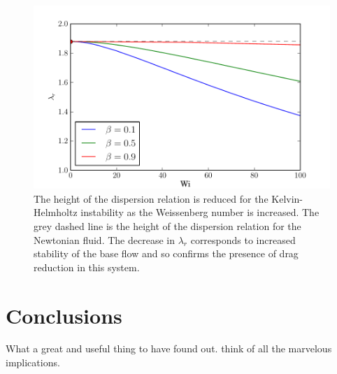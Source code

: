 \documentclass{jfm}
\begin{document}
\begin{figure}
    \centering
    \includegraphics[width=\textwidth]{KH_high_Re_vary_Wi}
    \caption{The height of the dispersion relation is reduced for the Kelvin-Helmholtz instability as the Weissenberg number is increased. The grey dashed line is the height of the dispersion relation for the Newtonian fluid. The decrease in $\lambda_{r}$ corresponds to increased stability of the base flow and so confirms the presence of drag reduction in this system.}
    \label{fig:KH_drag_reduction}
\end{figure}

\section{Conclusions}

What a great and useful thing to have found out. think of all the marvelous implications.





%
\end{document}
